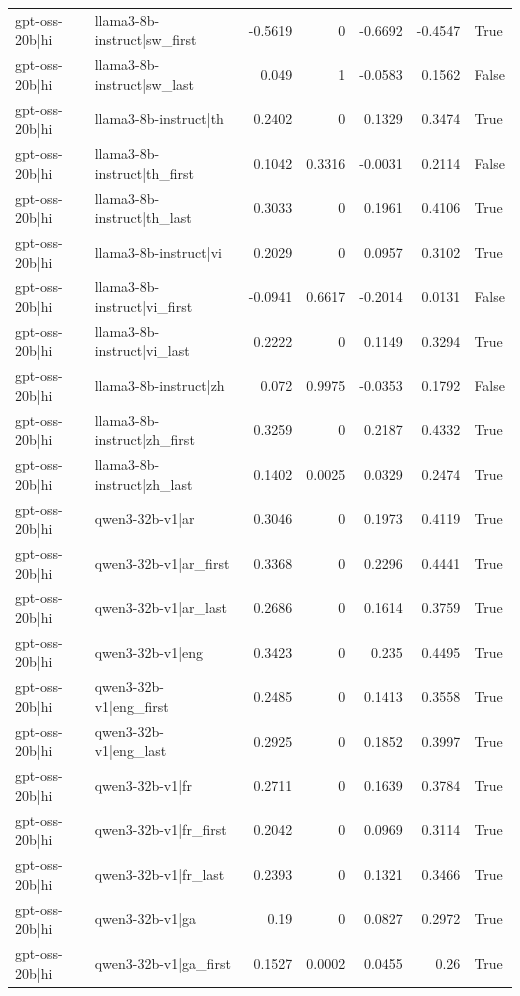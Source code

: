 \begin{table}
\begin{tabular}{l l r r r r l}
gpt-oss-20b|hi & llama3-8b-instruct|sw_first & -0.5619 & 0 & -0.6692 & -0.4547 & True \\
gpt-oss-20b|hi & llama3-8b-instruct|sw_last & 0.049 & 1 & -0.0583 & 0.1562 & False \\
gpt-oss-20b|hi & llama3-8b-instruct|th & 0.2402 & 0 & 0.1329 & 0.3474 & True \\
gpt-oss-20b|hi & llama3-8b-instruct|th_first & 0.1042 & 0.3316 & -0.0031 & 0.2114 & False \\
gpt-oss-20b|hi & llama3-8b-instruct|th_last & 0.3033 & 0 & 0.1961 & 0.4106 & True \\
gpt-oss-20b|hi & llama3-8b-instruct|vi & 0.2029 & 0 & 0.0957 & 0.3102 & True \\
gpt-oss-20b|hi & llama3-8b-instruct|vi_first & -0.0941 & 0.6617 & -0.2014 & 0.0131 & False \\
gpt-oss-20b|hi & llama3-8b-instruct|vi_last & 0.2222 & 0 & 0.1149 & 0.3294 & True \\
gpt-oss-20b|hi & llama3-8b-instruct|zh & 0.072 & 0.9975 & -0.0353 & 0.1792 & False \\
gpt-oss-20b|hi & llama3-8b-instruct|zh_first & 0.3259 & 0 & 0.2187 & 0.4332 & True \\
gpt-oss-20b|hi & llama3-8b-instruct|zh_last & 0.1402 & 0.0025 & 0.0329 & 0.2474 & True \\
gpt-oss-20b|hi & qwen3-32b-v1|ar & 0.3046 & 0 & 0.1973 & 0.4119 & True \\
gpt-oss-20b|hi & qwen3-32b-v1|ar_first & 0.3368 & 0 & 0.2296 & 0.4441 & True \\
gpt-oss-20b|hi & qwen3-32b-v1|ar_last & 0.2686 & 0 & 0.1614 & 0.3759 & True \\
gpt-oss-20b|hi & qwen3-32b-v1|eng & 0.3423 & 0 & 0.235 & 0.4495 & True \\
gpt-oss-20b|hi & qwen3-32b-v1|eng_first & 0.2485 & 0 & 0.1413 & 0.3558 & True \\
gpt-oss-20b|hi & qwen3-32b-v1|eng_last & 0.2925 & 0 & 0.1852 & 0.3997 & True \\
gpt-oss-20b|hi & qwen3-32b-v1|fr & 0.2711 & 0 & 0.1639 & 0.3784 & True \\
gpt-oss-20b|hi & qwen3-32b-v1|fr_first & 0.2042 & 0 & 0.0969 & 0.3114 & True \\
gpt-oss-20b|hi & qwen3-32b-v1|fr_last & 0.2393 & 0 & 0.1321 & 0.3466 & True \\
gpt-oss-20b|hi & qwen3-32b-v1|ga & 0.19 & 0 & 0.0827 & 0.2972 & True \\
gpt-oss-20b|hi & qwen3-32b-v1|ga_first & 0.1527 & 0.0002 & 0.0455 & 0.26 & True \\

\end{tabular}
\end{table}
